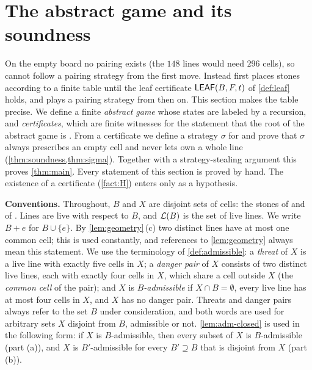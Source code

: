 
\section{The abstract game and its soundness}\label{sec:game}

On the empty board no pairing exists (the $148$ lines would need $296$ cells), so \Breaker{} cannot follow a
pairing strategy from the first move. Instead \Breaker{} first places stones according to a finite table until
the leaf certificate $\mathsf{LEAF}(B,F,t)$ of \cref{def:leaf} holds, and plays a pairing strategy from then
on. This section makes the table precise. We define a finite \emph{abstract game} whose states are labeled
\WON{} by a recursion, and \emph{certificates}, which are finite witnesses for the statement that the root of
the abstract game is \WON. From a certificate we define a strategy $\sigma$ for \Breaker{} and prove that
$\sigma$ always prescribes an empty cell and never lets \Maker{} own a whole line
(\cref{thm:soundness,thm:sigma}). Together with a strategy-stealing argument this proves
\cref{thm:main}. Every statement of this section is proved by hand. The existence of a certificate
(\cref{fact:H}) enters only as a hypothesis.

\medskip\noindent\textbf{Conventions.}
Throughout, $B$ and $X$ are disjoint sets of cells: the stones of \Breaker{} and of \Maker. Lines are live
with respect to $B$, and $\mathcal{L}(B)$ is the set of live lines. We write $B+e$ for $B\cup\{e\}$. By
\cref{lem:geometry}\,(c) two distinct lines have at most one common cell; this is used constantly, and
references to \cref{lem:geometry} always mean this statement. We use
the terminology of \cref{def:admissible}: a \emph{threat} of $X$ is a live line with exactly five cells in
$X$; a \emph{danger pair} of $X$ consists of two distinct live lines, each with exactly four cells in $X$,
which share a cell outside $X$ (the \emph{common cell} of the pair); and $X$ is \emph{$B$-admissible} if
$X\cap B=\emptyset$, every live line has at most four cells in $X$, and $X$ has no danger pair. Threats and
danger pairs always refer to the set $B$ under consideration, and both words are used for arbitrary sets
$X$ disjoint from $B$, admissible or not. \cref{lem:adm-closed} is used in the following form: if $X$ is
$B$-admissible, then every subset of $X$ is $B$-admissible (part (a)), and $X$ is $B'$-admissible for every
$B'\supseteq B$ that is disjoint from $X$ (part (b)).

